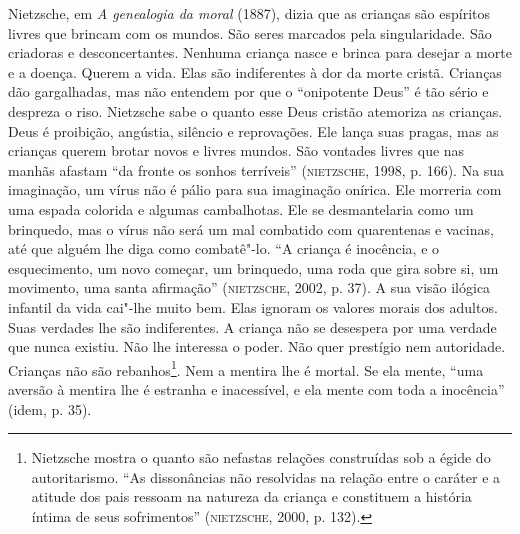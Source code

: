 Nietzsche, em \emph{A genealogia da moral} (1887), dizia que as crianças
são espíritos livres que brincam com os mundos. São seres marcados pela
singularidade. São criadoras e desconcertantes. Nenhuma criança nasce e
brinca para desejar a morte e a doença. Querem a vida. Elas são
indiferentes à dor da morte cristã. Crianças dão gargalhadas, mas não
entendem por que o ``onipotente Deus'' é tão sério e despreza o riso.
Nietzsche sabe o quanto esse Deus cristão atemoriza as crianças. Deus é
proibição, angústia, silêncio e reprovações. Ele lança suas pragas, mas
as crianças querem brotar novos e livres mundos. São vontades livres que
nas manhãs afastam ``da fronte os sonhos terríveis'' (\textsc{nietzsche}, 1998,
p. 166). Na sua imaginação, um vírus não é pálio para sua imaginação
onírica. Ele morreria com uma espada colorida e algumas cambalhotas. Ele
se desmantelaria como um brinquedo, mas o vírus não será um mal
combatido com quarentenas e vacinas, até que alguém lhe diga como
combatê"-lo. ``A criança é inocência, e o esquecimento, um novo começar,
um brinquedo, uma roda que gira sobre si, um movimento, uma santa
afirmação'' (\textsc{nietzsche}, 2002, p. 37). A sua visão ilógica infantil da
vida cai"-lhe muito bem. Elas ignoram os valores morais dos adultos. Suas
verdades lhe são indiferentes. A criança não se desespera por uma
verdade que nunca existiu. Não lhe interessa o poder. Não quer prestígio
nem autoridade. Crianças não são rebanhos\footnote{Nietzsche mostra o
  quanto são nefastas relações construídas sob a égide do autoritarismo.
  ``As dissonâncias não resolvidas na relação entre o caráter e a
  atitude dos pais ressoam na natureza da criança e constituem a
  história íntima de seus sofrimentos'' (\textsc{nietzsche}, 2000, p. 132).}. Nem
a mentira lhe é mortal. Se ela mente, ``uma aversão à mentira lhe é
estranha e inacessível, e ela mente com toda a inocência'' (idem, p.
35).

